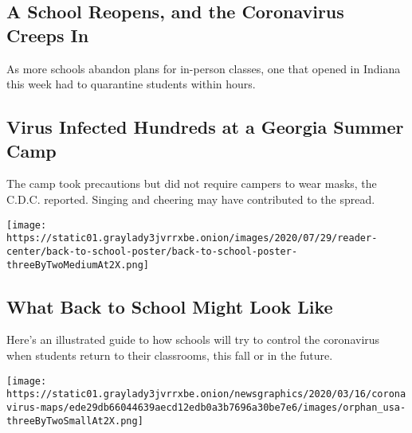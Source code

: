 \href{/2020/08/01/us/schools-reopening-indiana-coronavirus.html}{}

\hypertarget{a-school-reopens-and-the-coronavirus-creeps-in}{%
\subsection{A School Reopens, and the Coronavirus Creeps
In}\label{a-school-reopens-and-the-coronavirus-creeps-in}}

As more schools abandon plans for in-person classes, one that opened in
Indiana this week had to quarantine students within hours.

\href{/2020/07/31/health/coronavirus-children-camp.html}{}

\hypertarget{virus-infected-hundreds-at-a-georgia-summer-camp}{%
\subsection{Virus Infected Hundreds at a Georgia Summer
Camp}\label{virus-infected-hundreds-at-a-georgia-summer-camp}}

The camp took precautions but did not require campers to wear masks, the
C.D.C. reported. Singing and cheering may have contributed to the
spread.

\href{/interactive/2020/07/29/us/schools-reopening-coronavirus.html}{}

\texttt{[image: https://static01.graylady3jvrrxbe.onion/images/2020/07/29/reader-center/back-to-school-poster/back-to-school-poster-threeByTwoMediumAt2X.png]}

\href{/interactive/2020/07/29/us/schools-reopening-coronavirus.html}{}

\hypertarget{what-back-to-school-might-look-like}{%
\subsection{What Back to School Might Look
Like}\label{what-back-to-school-might-look-like}}

Here's an illustrated guide to how schools will try to control the
coronavirus when students return to their classrooms, this fall or in
the future.

\texttt{[image: https://static01.graylady3jvrrxbe.onion/newsgraphics/2020/03/16/coronavirus-maps/ede29db66044639aecd12edb0a3b7696a30be7e6/images/orphan\_usa-threeByTwoSmallAt2X.png]}

\href{/2020/08/01/world/europe/germany-nazi-infiltration.html}{}

